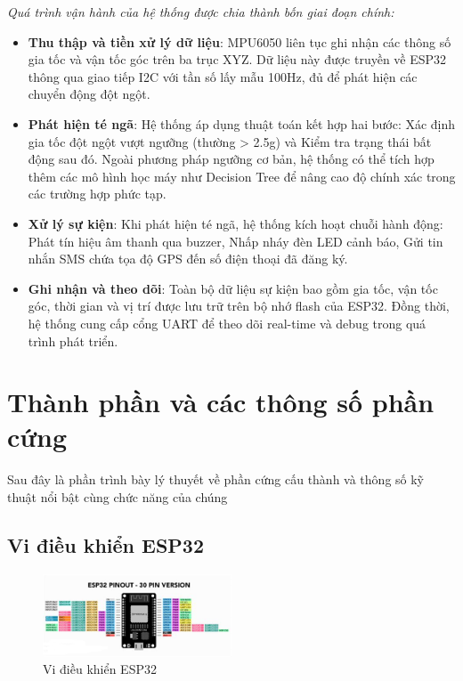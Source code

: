\documentclass[a4paper,12pt]{report}
\begin{document}
	
	\textit{Quá trình vận hành của hệ thống được chia thành bốn giai đoạn chính:}
	
	\begin{itemize}
		\item \textbf{Thu thập và tiền xử lý dữ liệu}: MPU6050 liên tục ghi nhận các thông số gia tốc và vận tốc góc trên ba trục XYZ. Dữ liệu này được truyền về ESP32 thông qua giao tiếp I2C với tần số lấy mẫu 100Hz, đủ để phát hiện các chuyển động đột ngột.
		
		\newpage 
		
		\item \textbf{Phát hiện té ngã}: Hệ thống áp dụng thuật toán kết hợp hai bước:  Xác định gia tốc đột ngột vượt ngưỡng (thường > 2.5g) và  Kiểm tra trạng thái bất động sau đó. Ngoài phương pháp ngưỡng cơ bản, hệ thống có thể tích hợp thêm các mô hình học máy như Decision Tree để nâng cao độ chính xác trong các trường hợp phức tạp.
		
		
		
		\item \textbf{Xử lý sự kiện}: Khi phát hiện té ngã, hệ thống kích hoạt chuỗi hành động: Phát tín hiệu âm thanh qua buzzer,  Nhấp nháy đèn LED cảnh báo,  Gửi tin nhắn SMS chứa tọa độ GPS đến số điện thoại đã đăng ký.
		
		\item \textbf{Ghi nhận và theo dõi}: Toàn bộ dữ liệu sự kiện bao gồm gia tốc, vận tốc góc, thời gian và vị trí được lưu trữ trên bộ nhớ flash của ESP32. Đồng thời, hệ thống cung cấp cổng UART để theo dõi real-time và debug trong quá trình phát triển.
	\end{itemize}
	
	
	\section{Thành phần và các thông số phần cứng}
	Sau đây là phần trình bày lý thuyết về phần cứng cấu thành và thông số kỹ thuật nổi bật cùng chức năng của chúng
	\subsection{Vi điều khiển ESP32}
	
	\begin{figure}[h]
		\centering
		\includegraphics[width=0.5\textwidth]{ESP32_30_PIN.png}
		\caption{Vi điều khiển ESP32}
		\label{fig:esp32}
	\end{figure}
	
\end{document}
